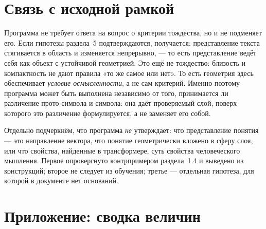 \documentclass[11pt,a4paper]{article}
\theoremstyle{definition}
\theoremstyle{plain}
\begin{document}
\section{Связь с исходной рамкой}

Программа не требует ответа на вопрос о критерии тождества, но и не подменяет его. Если
гипотезы раздела~5 подтверждаются, получается: представление текста стягивается в область и
изменяется непрерывно, — то есть представление ведёт себя как объект с устойчивой геометрией.
Это ещё не тождество: близость и компактность не дают правила «то же самое или нет». То есть
геометрия здесь обеспечивает \emph{условие осмысленности}, а не сам критерий. Именно поэтому
программа может быть выполнена независимо от того, принимается ли различение
прото-символа и символа: она даёт проверяемый слой, поверх которого это различение
формулируется, а не заменяет его собой.

Отдельно подчеркнём, что программа \emph{не} утверждает: что представление понятия — это
направление вектора, что понятие геометрически вложено в сферу слоя, или что свойства, найденные
в трансформере, суть свойства человеческого мышления. Первое опровергнуто контрпримером
раздела~1.4 и выведено из конструкций; второе не следует из обучения; третье — отдельная
гипотеза, для которой в документе нет оснований.

\section*{Приложение: сводка величин}
\end{document}
